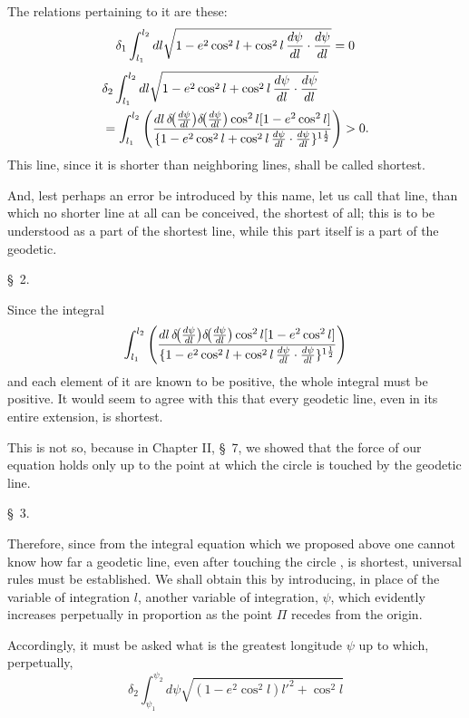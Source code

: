 The relations pertaining to it are these:
\[
 \delta_1\int_{l_1}^{l_2}dl\sqrt{1-e^2\cos^2l+\cos^2l\,{d\psi\over dl}\cdot{d\psi\over dl}}=0
\]
\[
\begin{aligned}
&\delta_2\int_{l_1}^{l_2}dl\sqrt{1-e^2\cos^2l+\cos^2l\,{d\psi\over dl}\cdot{d\psi\over dl}}\\
&=\int_{l_1}^{l_2}\left(
{dl\,\delta\!\bigl({d\psi\over dl}\bigr)\delta\!\bigl({d\psi\over dl}\bigr)\cos^2l[1-e^2\cos^2l]
\over \{1-e^2\cos^2l+\cos^2l\,{d\psi\over dl}\cdot{d\psi\over dl}\}^{1\frac12}}
\right)>0.
\end{aligned}
\]
This line, since it is shorter than neighboring lines, shall be called shortest.

And, lest perhaps an error be introduced by this name, let us call that line, than which no shorter line at all can be conceived, the shortest of all; this is to be understood as a part of the shortest line, while this part itself is a part of the geodetic.

\begin{center}\S\ 2.\end{center}

Since the integral
\[
 \int_{l_1}^{l_2}\left(
{dl\,\delta\!\bigl({d\psi\over dl}\bigr)\delta\!\bigl({d\psi\over dl}\bigr)\cos^2l[1-e^2\cos^2l]
\over \{1-e^2\cos^2l+\cos^2l\,{d\psi\over dl}\cdot{d\psi\over dl}\}^{1\frac12}}
\right)
\]
and each element of it are known to be positive, the whole integral must be positive. It would seem to agree with this that every geodetic line, even in its entire extension, is shortest.

This is not so, because in Chapter II, \S\ 7, we showed that the force of our equation holds only up to the point at which the circle  is touched by the geodetic line.

\begin{center}\S\ 3.\end{center}

Therefore, since from the integral equation which we proposed above one cannot know how far a geodetic line, even after touching the circle , is shortest, universal rules must be established. We shall obtain this by introducing, in place of the variable of integration $l$, another variable of integration, $\psi$, which evidently increases perpetually in proportion as the point $\Pi$ recedes from the origin.

Accordingly, it must be asked what is the greatest longitude $\psi$ up to which, perpetually,
\[
 \delta_2\int_{\psi_1}^{\psi_2}d\psi\sqrt{(1-e^2\cos^2l)l'^2+\cos^2l}
\]
